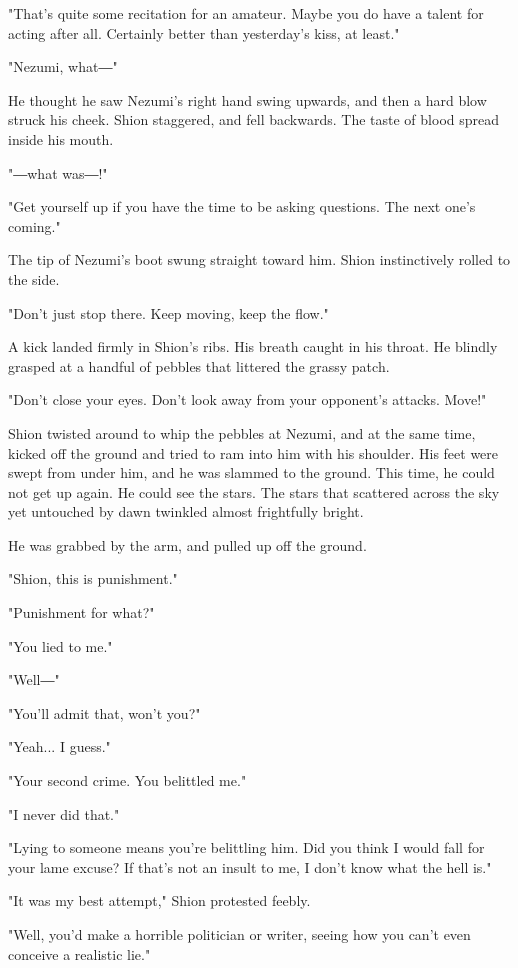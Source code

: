 "That's quite some recitation for an amateur. Maybe you do have a talent
for acting after all. Certainly better than yesterday's kiss, at least."

"Nezumi, what―"

He thought he saw Nezumi's right hand swing upwards, and then a hard
blow struck his cheek. Shion staggered, and fell backwards. The taste of
blood spread inside his mouth.

"―what was―!"

"Get yourself up if you have the time to be asking questions. The next
one's coming."

The tip of Nezumi's boot swung straight toward him. Shion instinctively
rolled to the side.

"Don't just stop there. Keep moving, keep the flow."

A kick landed firmly in Shion's ribs. His breath caught in his throat.
He blindly grasped at a handful of pebbles that littered the grassy
patch.

"Don't close your eyes. Don't look away from your opponent's attacks.
Move!"

Shion twisted around to whip the pebbles at Nezumi, and at the same
time, kicked off the ground and tried to ram into him with his shoulder.
His feet were swept from under him, and he was slammed to the ground.
This time, he could not get up again. He could see the stars. The stars
that scattered across the sky yet untouched by dawn twinkled almost
frightfully bright.

He was grabbed by the arm, and pulled up off the ground.

"Shion, this is punishment."

"Punishment for what?"

"You lied to me."

"Well―"

"You'll admit that, won't you?"

"Yeah... I guess."

"Your second crime. You belittled me."

"I never did that."

"Lying to someone means you're belittling him. Did you think I would
fall for your lame excuse? If that's not an insult to me, I don't know
what the hell is."

"It was my best attempt," Shion protested feebly.

"Well, you'd make a horrible politician or writer, seeing how you can't
even conceive a realistic lie."

